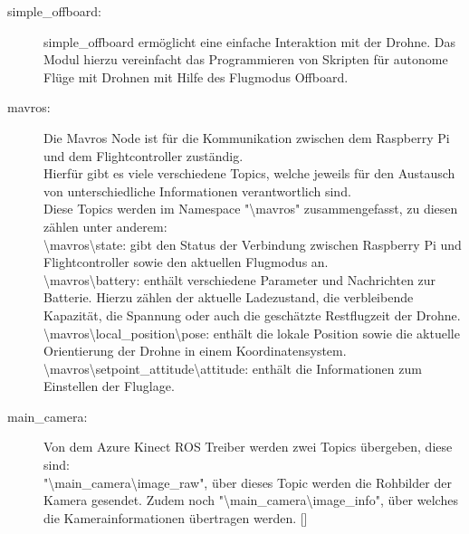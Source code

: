 \begin{description}
    \item[simple\_offboard:]{simple\_offboard ermöglicht eine einfache Interaktion mit der Drohne. Das Modul hierzu vereinfacht das Programmieren von Skripten für autonome Flüge mit Drohnen mit Hilfe des Flugmodus Offboard. \cite[vgl.][]{simple_offboard}}
    \item[mavros:]{Die Mavros Node ist für die Kommunikation zwischen dem Raspberry Pi und dem Flightcontroller zuständig.\\
    Hierfür gibt es viele verschiedene Topics, welche jeweils für den Austausch von unterschiedliche Informationen verantwortlich sind.\\
    Diese Topics werden im Namespace "\textbackslash mavros" zusammengefasst, zu diesen zählen unter anderem:\\
    \textbackslash mavros\textbackslash state: gibt den Status der Verbindung zwischen Raspberry Pi und Flightcontroller sowie den aktuellen Flugmodus an.\\
    \textbackslash mavros\textbackslash battery: enthält verschiedene Parameter und Nachrichten zur Batterie. Hierzu zählen der aktuelle Ladezustand, die verbleibende Kapazität, die Spannung oder auch die geschätzte Restflugzeit der Drohne.\\
    \textbackslash mavros\textbackslash local\_position\textbackslash pose: enthält die lokale Position sowie die aktuelle Orientierung der Drohne in einem Koordinatensystem.\\
    \textbackslash mavros\textbackslash setpoint\_attitude\textbackslash attitude: enthält die Informationen zum Einstellen der Fluglage. \cite[vgl.][]{mavros}}
    \item[main\_camera:]{Von dem Azure Kinect ROS Treiber werden zwei Topics übergeben, diese sind: \\
    "\textbackslash main\_camera\textbackslash image\_raw", über dieses Topic werden die Rohbilder der Kamera gesendet. Zudem noch "\textbackslash main\_camera\textbackslash image\_info", über welches die Kamerainformationen übertragen werden. []}
\end{description}
 
